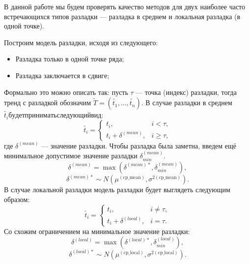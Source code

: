 \documentclass[%
12pt,
master,  %
natbib,      %
subf,        %
substylefile = spbu.rtx,
href,        %
colorlinks,  %
]{disser}
\begin{document}
В данной работе мы будем проверять качество методов для двух наиболее часто встречающихся типов разладки --- разладка в среднем и локальная разладка (в одной точке).

Построим модель разладки, исходя из следующего:
\begin{itemize}
	\item Разладка только в одной точке ряда;
	\item Разладка заключается в сдвиге;
\end{itemize}
Формально это можно описать так: пусть $\tau$ --- точка (индекс) разладки, тогда тренд с разладкой обозначим $ \tilde{T} = (\tilde{t_1}, \dots, \tilde{t_n}) $. В случае разладки в среднем $\tilde{t_i} будет принимать следующий вид:$
\begin{equation*}
\tilde{t_i} =
	\begin{cases}
		t_i, & i < \tau, \\
		t_i + \delta^{(mean)}, & i \geqslant \tau,
	\end{cases}
\end{equation*}
где $ \delta^{(mean)} $  --- значение разладки. Чтобы разладка была заметна, введем ещё минимальное допустимое значение разладки $\delta_{min}^{(mean)}$.
\begin{equation*}
\delta^{(mean)} = \max(\delta^{(mean)*}, \delta_{min}^{(mean)} ),
\end{equation*}
\begin{equation*}
\delta^{(mean)*} \sim N(\mu^{\mathrm{(cp\_mean)}}, \sigma^{2\mathrm{(cp\_mean)}}).
\end{equation*}
В случае локальной разладки модель разладки будет выглядеть следующим образом:
\begin{equation*}
\tilde{t_i} =
	\begin{cases}
		t_i, & i \neq \tau, \\
		t_i + \delta^{(local)}, & i = \tau.
	\end{cases}
\end{equation*}
Со схожим ограничением на минимальное значение разладки:
\begin{equation*}
\delta^{(local)} = \max(\delta^{(local)*}, \delta_{min}^{(local)} ),
\end{equation*}
\begin{equation*}
\delta^{(local)*} \sim N(\mu^{\mathrm{(cp\_local)}}, \sigma^{2\mathrm{(cp\_local)}}).
\end{equation*}
\end{document}
